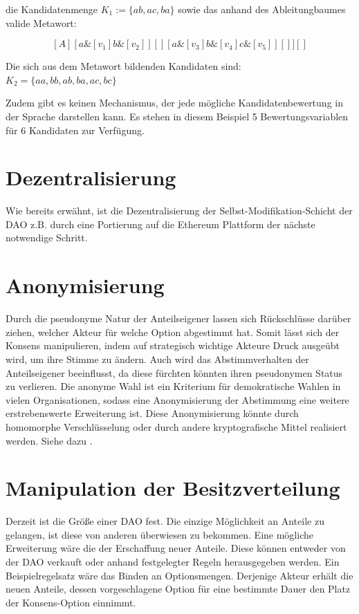 \documentclass[a4paper,12pt]{report}
\begin{document}
die Kandidatenmenge $K_1:=\{ab, ac, ba\}$ sowie das anhand des Ableitungbaumes valide Metawort: 

\[ [A][ a\&[v_1]b\&[v_2] ][][ a\&[v_3]b\&[v_4]c\&[v_5] ][] ][] \] 


Die sich aus dem Metawort bildenden Kandidaten sind: $K_2=\{ aa, bb, ab, ba, ac, bc \}$

Zudem gibt es keinen Mechanismus, der jede mögliche Kandidatenbewertung in der Sprache darstellen kann. Es stehen in diesem Beispiel 5 Bewertungsvariablen für 6 Kandidaten zur Verfügung. 

\section{Dezentralisierung}
Wie bereits erwähnt, ist die Dezentralisierung der Selbst-Modifikation-Schicht der DAO z.B. durch eine Portierung auf die Ethereum Plattform der nächste notwendige Schritt.

\section{Anonymisierung}
Durch die pseudonyme Natur der Anteilseigener lassen sich Rückschlüsse darüber ziehen, welcher Akteur für welche Option abgestimmt hat. Somit lässt sich der Konsens manipulieren, indem auf strategisch wichtige Akteure Druck ausgeübt wird, um ihre Stimme zu ändern. Auch wird das Abstimmverhalten der Anteilseigener beeinflusst, da diese fürchten könnten ihren pseudonymen Status zu verlieren. Die anonyme Wahl ist ein Kriterium für demokratische Wahlen in vielen Organisationen, sodass eine Anonymisierung der Abstimmung eine weitere erstrebenswerte Erweiterung ist. Diese Anonymisierung könnte durch homomorphe Verschlüsselung\cite{Gentry2009} oder durch andere kryptografische Mittel realisiert werden. Siehe dazu \cite{Fouard2007a}.

\section{Manipulation der Besitzverteilung}
Derzeit ist die Größe einer DAO fest. Die einzige Möglichkeit an Anteile zu gelangen, ist diese von anderen überwiesen zu bekommen. Eine mögliche Erweiterung wäre die der Erschaffung neuer Anteile. Diese können entweder von der DAO verkauft oder anhand festgelegter Regeln herausgegeben werden. Ein Beispielregelsatz wäre das Binden an Optionsmengen. Derjenige Akteur erhält die neuen Anteile, dessen vorgeschlagene Option für eine bestimmte Dauer den Platz der Konsens-Option einnimmt.
\end{document}
